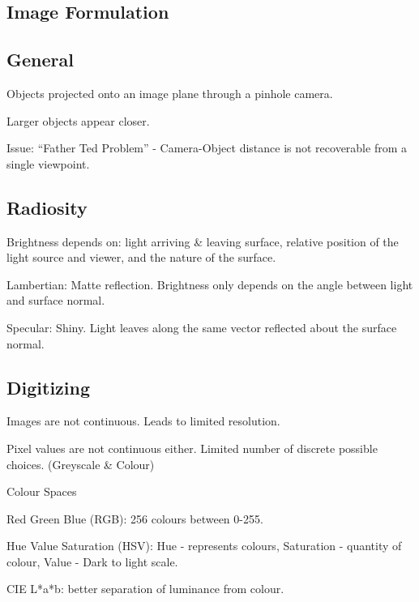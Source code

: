 \documentclass[8pt]{extarticle}
\begin{document}
\begin{multicols}{2}
\section{Image Formulation}

\subsection{General}
\begin{compactitem}
    \item Objects projected onto an image plane through a pinhole camera.
    \item Larger objects appear closer.
    \item Issue: ``Father Ted Problem'' - Camera-Object distance is not recoverable from a single viewpoint.
\end{compactitem}

\subsection{Radiosity}
\begin{compactitem}
    \item Brightness depends on: light arriving \& leaving surface, relative position of the light source and viewer, and the nature of the surface.
    \item Lambertian: Matte reflection. Brightness only depends on the angle between light and surface normal.
    \item Specular: Shiny. Light leaves along the same vector reflected about the surface normal.
\end{compactitem}

\subsection{Digitizing}
\begin{compactitem}
    \item Images are not continuous. Leads to limited resolution.
    \item Pixel values are not continuous either. Limited number of discrete possible choices. (Greyscale \& Colour)
    \item Colour Spaces
    \begin{compactitem}
        \item Red Green Blue (RGB): 256 colours between 0-255.
        \item Hue Value Saturation (HSV): Hue - represents colours, Saturation - quantity of colour, Value - Dark to light scale.
        \item CIE L*a*b: better separation of luminance from colour.
    \end{compactitem}
\end{compactitem}


\end{multicols}
\end{document}
